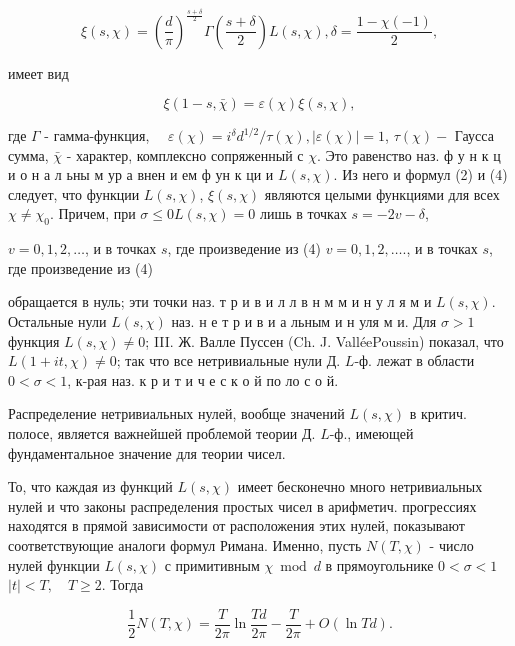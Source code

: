 \documentclass[10pt]{article}
\begin{document}
\[

\xi(s, \chi)=\left(\frac{d}{\pi}\right)^{\frac{s+\delta}{2}} \Gamma\left(\frac{s+\delta}{2}\right) L(s, \chi), \delta=\frac{1-\chi(-1)}{2},

\]



имеет вид



\[

\xi(1-s, \bar{\chi})=\varepsilon(\chi) \xi(s, \chi),

\]



где $\Gamma$ - гамма-функция, $\quad \varepsilon(\chi)=i^{\delta} d^{1 / 2} / \tau(\chi),|\varepsilon(\chi)|=1$, $\tau(\chi)-$ Гаусса сумма, $\bar{\chi}$ - характер, комплексно сопряженный с $\chi$. Это равенство наз. ф у н к ц и о н а л ьны м ур а внен и ем ф ун к ци и $L(s, \chi)$. Из него и формул (2) и (4) следует, что функции $L(s, \chi)$, $\xi(s, \chi)$ являются целыми функциями для всех $\chi \neq \chi_{0}$. Причем, при $\sigma \leqslant 0 L(s, \chi)=0$ лишь в точках $s=-2 v-\delta$,

$v=0,1,2, \ldots$, и в точках $s$, где произведение из (4) $v=0,1,2, \ldots .$, и в точках $s$, где произведение из (4)

обращается в нуль; эти точки наз. т р и в и л л в н м м и н у л я м и $L(s, \chi)$. Остальные нули $L(s, \chi)$ наз. н е т р и в и а льным и н уля м и. Для $\sigma>1$ функция $L(s, \chi) \neq 0$; III. Ж. Валле Пуссен (Ch. J. ValléePoussin) показал, что $L(1+i t, \chi) \neq 0$; так что все нетривиальные нули Д. $L$-ф. лежат в области $0<\sigma<1$, к-рая наз. к р и т и ч е с к о й по ло с о й.



Распределение нетривиальных нулей, вообще значений $L(s, \chi)$ в критич. полосе, является важнейшей проблемой теории Д. $L$-ф., имеющей фундаментальное значение для теории чисел.



То, что каждая из функций $L(s, \chi)$ имеет бесконечно много нетривиальных нулей и что законы распределения простых чисел в арифметич. прогрессиях находятся в прямой зависимости от расположения этих нулей, показывают соответствующие аналоги формул Римана. Именно, пусть $N(T, \chi)$ - число нулей функции $L(s, \chi)$ с примитивным $\chi \bmod d$ в прямоугольнике $0<\sigma<1$ $|t|<T, \quad T \geqslant 2$. Тогда



\[

\frac{1}{2} N(T, \chi)=\frac{T}{2 \pi} \ln \frac{T d}{2 \pi}-\frac{T}{2 \pi}+O(\ln T d) .

\]
\end{document}
